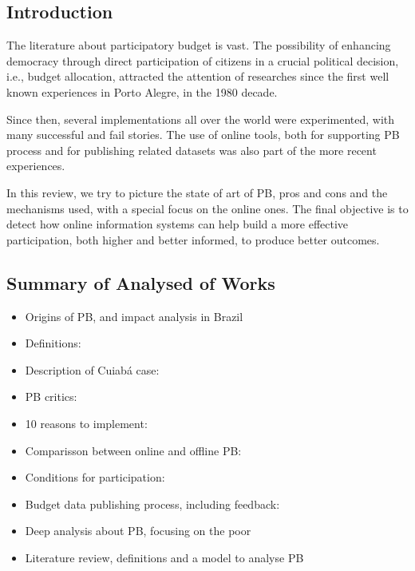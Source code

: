 
\subsection{Introduction}
The literature about participatory budget is vast. The possibility of enhancing democracy through direct participation of citizens in a crucial political decision, i.e., budget allocation, attracted the attention of researches since the first well known experiences in Porto Alegre, in the 1980 decade.

Since then, several implementations all over the world were experimented, with many successful and fail stories. The use of online tools, both for supporting PB process and for publishing related datasets was also part of the more recent experiences.

In this review, we try to picture the state of art of PB, pros and cons and the mechanisms used, with a special focus on the online ones. The final objective is to detect how online information systems can help build a more effective participation, both higher and better informed, to produce better outcomes.

\subsection{Summary of Analysed of Works}
\begin{itemize}
	\item Origins of PB, and impact analysis in Brazil~\cite{Goncalves2014}
	\item Definitions: \cite{Zhang2013}
	\item Description of Cuiabá case: \cite{Borges2012}
	\item PB critics: \cite{Masser2013}
	\item 10 reasons to implement: \cite{Nitschke2013}
	\item Comparisson between online and offline PB: \cite{Peixoto2009}
	\item Conditions for participation: \cite{Addor2012}
	\item Budget data publishing process, including feedback: \cite{Alexopoulos2014}
	\item Deep analysis about PB, focusing on the poor \cite{TheWorldBank2001}
	\item Literature review, definitions and a model to analyse PB \cite{Miller2014}
\end{itemize}

